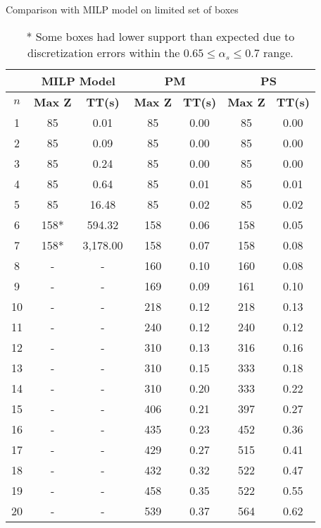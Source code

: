 \begin{table}[htbp]
    \centering
    \caption{Comparison with MILP model on limited set of boxes}
    \begin{tabular}{|c|c|c|c|c|c|c|}
    \hline
    & \multicolumn{ 2}{c|}{\textbf{MILP Model}} & \multicolumn{ 2}{c|}{\textbf{PM}} & \multicolumn{ 2}{c|}{\textbf{PS}} \\ \hline
    \textbf{$n$} & \textbf{Max Z} & \textbf{TT(s)} & \textbf{Max Z} & \textbf{TT(s)} & \textbf{Max Z} & \textbf{TT(s)} \\ \hline
    1  & 85   & 0.01     & 85  & 0.00 & 85  & 0.00 \\ 
    2  & 85   & 0.09     & 85  & 0.00 & 85  & 0.00 \\ 
    3  & 85   & 0.24     & 85  & 0.00 & 85  & 0.00 \\ 
    4  & 85   & 0.64     & 85  & 0.01 & 85  & 0.01 \\ 
    5  & 85   & 16.48    & 85  & 0.02 & 85  & 0.02 \\ 
    6  & 158* & 594.32   & 158 & 0.06 & 158 & 0.05 \\ 
    7  & 158* & 3,178.00 & 158 & 0.07 & 158 & 0.08 \\ \hline
    8  & -    & -        & 160 & 0.10 & 160 & 0.08 \\ 
    9  & -    & -        & 169 & 0.09 & 161 & 0.10 \\ 
    10 & -    & -        & 218 & 0.12 & 218 & 0.13 \\ 
    11 & -    & -        & 240 & 0.12 & 240 & 0.12 \\ 
    12 & -    & -        & 310 & 0.13 & 316 & 0.16 \\ 
    13 & -    & -        & 310 & 0.15 & 333 & 0.18 \\ 
    14 & -    & -        & 310 & 0.20 & 333 & 0.22 \\ 
    15 & -    & -        & 406 & 0.21 & 397 & 0.27 \\ 
    16 & -    & -        & 435 & 0.23 & 452 & 0.36 \\ 
    17 & -    & -        & 429 & 0.27 & 515 & 0.41 \\ 
    18 & -    & -        & 432 & 0.32 & 522 & 0.47 \\ 
    19 & -    & -        & 458 & 0.35 & 522 & 0.55 \\ 
    20 & -    & -        & 539 & 0.37 & 564 & 0.62 \\ \hline
    \end{tabular}
    \label{exp:model}
    \caption*{* Some boxes had lower support than expected due to discretization errors within the $ 0.65 \le \alpha_s \le 0.7$ range.}
    \end{table}
